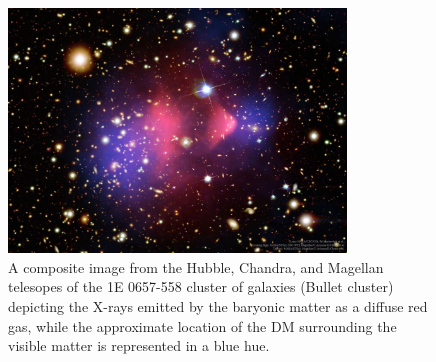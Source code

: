 \begin{figure}
  \centering
  \includegraphics[width=0.8\textwidth]{figs/bulletcluster_comp_960.jpg}
  \caption{A composite image from the Hubble, Chandra, and Magellan telesopes of the 1E 0657-558 cluster of galaxies (Bullet cluster) depicting the X-rays emitted by the baryonic matter as a diffuse red gas, while the approximate location of the DM surrounding the visible matter is represented in a blue hue.}
\label{fig:bulletcluster}
\end{figure}

